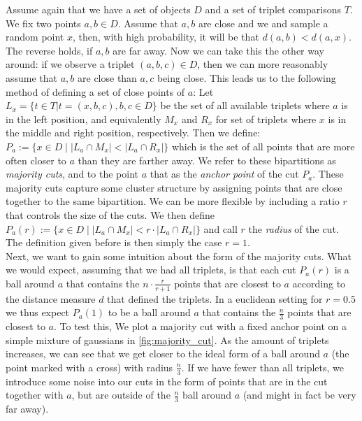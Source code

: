 Assume again that we have a set of objects $D$ and a set of triplet comparisons $T$. We fix two points $a,b \in D$. Assume that $a,b$ are close and we and sample a random point $x$,
then, with high probability, it will be that $d(a,b) < d(a,x)$. The reverse holds, if $a,b$ are far away. Now we can take this the other way around: 
if we observe a triplet $(a,b,c) \in D$, then we can more reasonably assume that $a,b$ are close than $a,c$ being close. This leads us to the following method of defining
a set of close points of $a$: Let $L_x = \{t \in T | t = (x, b,c), b,c \in D\}$ be the set of all available triplets where $a$ is in the left position, and equivalently $M_x$ and $R_x$ 
for set of triplets where $x$ is in the middle and right position, respectively. Then we define: $P_a := \{x \in D \mid \left|   L_a \cap M_x\right| < \left| L_a \cap R_x \right| \}$
which is the set of all points that are more often closer to $a$ than they are farther away. We refer to these bipartitions as \textit{majority cuts}, and to the point $a$ that
as the \textit{anchor point} of the cut $P_a$. These majority cuts capture
some cluster structure by assigning points that are close together to the same bipartition. We can be more flexible by including a ratio $r$ that controls the size of the cuts. We then define
$P_a(r) := \{x \in D \mid \left|   L_a \cap M_x\right| < r \cdot \left| L_a \cap R_x \right| \}$ and call $r$ the \textit{radius} of the cut. The definition given before is then simply the 
case $r = 1$. \\

Next, we want to gain some intuition about the form of the majority cuts. What we would expect, assuming that we had all triplets, is that each cut
$P_a(r)$ is a ball around $a$ that contains the $n \cdot \frac{r}{r+1}$ points that are closest to $a$ according to the distance measure $d$ that defined the triplets. In a euclidean setting for 
$r = 0.5$ we thus expect $P_a(1)$ to be a ball around $a$ that contains the $\frac{n}{3}$ points that are closest to $a$. To test this, We plot a majority cut with a fixed anchor point on a simple mixture of gaussians
in \autoref{fig:majority_cut}. As the amount of triplets increases, we can see that we get closer to the ideal form of a ball around $a$ (the point marked with a cross) with radius $\frac{n}{3}$. 
If we have fewer than all triplets, we introduce some noise into our cuts in the form of points that are in the cut together with $a$, but are outside of the $\frac{n}{3}$ ball around $a$
(and might in fact be very far away).\\

